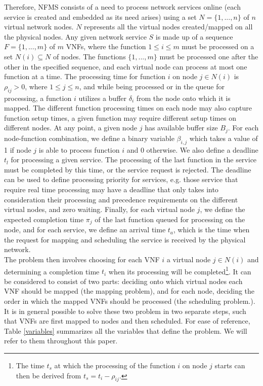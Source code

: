 \documentclass[conference]{IEEEtran}
\begin{document}
\indent Therefore, NFMS consists of a need to process network services online (each service is created and embedded as its need arises) using a set $N = \{1, . . . , n\}$ of $n$ virtual network nodes. $N$ represents all the virtual nodes created/mapped on all the physical nodes. Any given network service $S$ is made up of a sequence $F = \{1, . . . , m\}$ of $m$ VNFs, where the function $1\leq i \leq m$ must be processed on a set $N(i) \subseteq N$ of nodes. The functions $\{1, . . . , m\}$ must be processed one after the other in the specified sequence, and each virtual node can process at most one function at a time. The processing time for function $i$ on node $j \in N(i)$ is $\rho_{ij} > 0$, where $1\leq j\leq n$, and while being processed or in the queue for processing, a function $i$ utilizes a buffer $\delta_{i}$ from the node onto which it is mapped. The different function processing times on each node may also capture function setup times, a given function may require different setup times on different nodes. At any point, a given node $j$ has available buffer size $B_j$. For each node-function combination, we define a binary variable $\beta_{i,j}$ which takes a value of 1 if node $j$ is able to process function $i$ and 0 otherwise. We also define a deadline $t_l$ for processing a given service. The processing of the last function in the service must be completed by this time, or the service request is rejected. The deadline can be used to define processing priority for services, e.g. those service that require real time processing may have a deadline that only takes into consideration their processing and precedence requirements on the different virtual nodes, and zero waiting. Finally, for each virtual node $j$, we define the expected completion time $\pi_{j}$ of the last function queued for processing on the node, and for each service, we define an arrival time $t_a$, which is the time when the request for mapping and scheduling the service is received by the physical network.\\
\indent The problem then involves choosing for each VNF $i$ a virtual node $j \in N(i)$ and determining a completion time $t_i$ when its processing will be completed\footnote{The time $t_s$ at which the processing of the function $i$ on node $j$ starts can then be derived from $t_s = t_i - \rho_{ij}$.}. It can be considered to consist of two parts: deciding onto which virtual nodes each VNF should be mapped (the mapping problem), and for each node, deciding the order in which the mapped VNFs should be processed (the scheduling problem.). It is in general possible to solve these two problem in two separate steps, such that VNFs are first mapped to nodes and then scheduled. For ease of reference, Table \ref{variables} summarizes all the variables that define the problem. We will refer to them throughout this paper.
\end{document}
